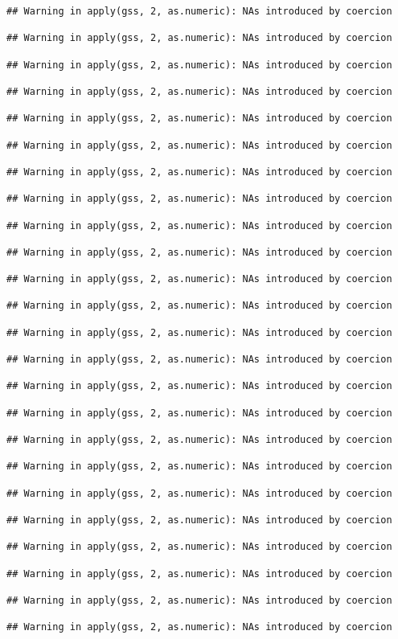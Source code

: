 \documentclass[
]{article}
\begin{document}
\begin{verbatim}
## Warning in apply(gss, 2, as.numeric): NAs introduced by coercion

## Warning in apply(gss, 2, as.numeric): NAs introduced by coercion

## Warning in apply(gss, 2, as.numeric): NAs introduced by coercion

## Warning in apply(gss, 2, as.numeric): NAs introduced by coercion

## Warning in apply(gss, 2, as.numeric): NAs introduced by coercion

## Warning in apply(gss, 2, as.numeric): NAs introduced by coercion

## Warning in apply(gss, 2, as.numeric): NAs introduced by coercion

## Warning in apply(gss, 2, as.numeric): NAs introduced by coercion

## Warning in apply(gss, 2, as.numeric): NAs introduced by coercion

## Warning in apply(gss, 2, as.numeric): NAs introduced by coercion

## Warning in apply(gss, 2, as.numeric): NAs introduced by coercion

## Warning in apply(gss, 2, as.numeric): NAs introduced by coercion

## Warning in apply(gss, 2, as.numeric): NAs introduced by coercion

## Warning in apply(gss, 2, as.numeric): NAs introduced by coercion

## Warning in apply(gss, 2, as.numeric): NAs introduced by coercion

## Warning in apply(gss, 2, as.numeric): NAs introduced by coercion

## Warning in apply(gss, 2, as.numeric): NAs introduced by coercion

## Warning in apply(gss, 2, as.numeric): NAs introduced by coercion

## Warning in apply(gss, 2, as.numeric): NAs introduced by coercion

## Warning in apply(gss, 2, as.numeric): NAs introduced by coercion

## Warning in apply(gss, 2, as.numeric): NAs introduced by coercion

## Warning in apply(gss, 2, as.numeric): NAs introduced by coercion

## Warning in apply(gss, 2, as.numeric): NAs introduced by coercion

## Warning in apply(gss, 2, as.numeric): NAs introduced by coercion


\end{verbatim}
\end{document}

